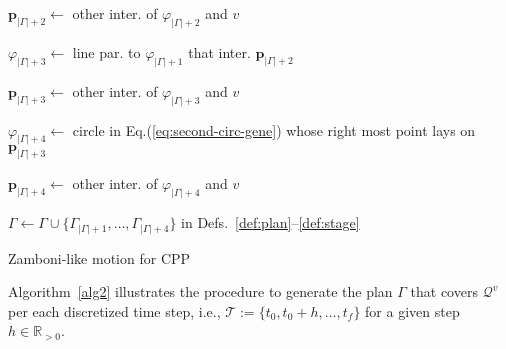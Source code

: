 \documentclass[letterpaper,10pt,journal,twoside]{IEEEtran}
\theoremstyle{definition}
\begin{document}
\begin{algorithm}[h]
\begin{algorithmic}[1]
          \STATE $\mathbf{p}_{|\Gamma|+2}\gets$ other inter. %
          of $\varphi_{|\Gamma|+2}$ and $v$\vspace*{.3ex}

          \STATE $\varphi_{|\Gamma|+3}\gets$ line %
          par. to $\varphi_{|\Gamma|+1}$ that inter. $\mathbf{p}_{|\Gamma|+2}$\vspace*{.3ex}

          \STATE $\mathbf{p}_{|\Gamma|+3}\gets$ other inter. %
          of $\varphi_{|\Gamma|+3}$ and $v$\vspace*{.3ex}

          \STATE $\varphi_{|\Gamma|+4}\gets$ circle in Eq.\hspace*{.7ex}(\ref{eq:second-circ-gene}) 
          whose right most point lays\vspace*{.3ex} \hspace*{1em}on $\mathbf{p}_{|\Gamma|+3}$\vspace*{.3ex}\label{alg2:circ2}

          \STATE $\mathbf{p}_{|\Gamma|+4}\gets$ other inter. %
          of $\varphi_{|\Gamma|+4}$ and $v$\vspace*{.3ex}\label{alg2:trig4}

          \vspace*{.8ex}
          \STATE $\Gamma\gets\Gamma\cup\{\Gamma_{|\Gamma|+1},\dots,\Gamma_{|\Gamma|+4}\}${ in Defs.~\ref{def:plan}--\ref{def:stage}}\label{alg2:last}

        \ENDIF
      \ENDIF
    \ENDFOR
  \end{algorithmic}
  \caption{Zamboni-like motion for CPP}\label{alg2}
\end{algorithm}

Algorithm~\ref{alg2} illustrates the procedure to generate the plan $\Gamma$ that covers $\mathcal{Q}^v$ per each discretized time step, i.e., $\mathcal{T}:=\{t_0,t_0+h,\dots,t_f\}$ for a given step $h\in\mathbb{R}_{>0}$.

\end{document}
